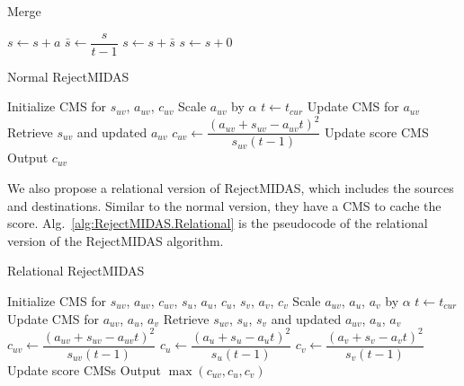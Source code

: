\documentclass[5p]{elsarticle}
\begin{document}
	\begin{algorithm}[!htb]
		\caption{Merge}
		\label{alg:RejectMIDAS.Merge}
		\begin{algorithmic}[1]
			\State $s\gets s+a$
			\State $\bar s\gets \dfrac{s}{t-1}$
			\State $s\gets s+\bar s$
			\Else
			\State $s\gets s+0$
			\EndIf
			\EndFor
		\end{algorithmic}
	\end{algorithm}

	\begin{algorithm}[!htb]
		\caption{Normal RejectMIDAS}
		\label{alg:RejectMIDAS.Normal}
		\begin{algorithmic}[1]
			\State Initialize CMS for $s_{uv}$, $a_{uv}$, $c_{uv}$
			\State {}
			\State Scale $a_{uv}$ by $\alpha$
			\State $t\gets t_{cur}$
			\EndIf
			\State Update CMS for $a_{uv}$
			\State Retrieve $s_{uv}$ and updated $a_{uv}$
			\State $c_{uv}\gets\dfrac{(a_{uv}+s_{uv}-a_{uv}t)^2}{s_{uv}(t-1)}$
			\State Update score CMS
			\State Output $c_{uv}$
			\EndWhile
		\end{algorithmic}
	\end{algorithm}

	We also propose a relational version of RejectMIDAS, which includes the sources and destinations. Similar to the normal version, they have a CMS to cache the score. Alg.~\ref{alg:RejectMIDAS.Relational} is the pseudocode of the relational version of the RejectMIDAS algorithm.

	\begin{algorithm}[!htb]
		\caption{Relational RejectMIDAS}
		\label{alg:RejectMIDAS.Relational}
		\begin{algorithmic}[1]
			\State Initialize CMS for $s_{uv}$, $a_{uv}$, $c_{uv}$, $s_u$, $a_u$, $c_u$, $s_v$, $a_v$, $c_v$
			\State {}
			\State {}
			\State {}
			\State Scale $a_{uv}$, $a_u$, $a_v$ by $\alpha$
			\State $t\gets t_{cur}$
			\EndIf
			\State Update CMS for $a_{uv}$, $a_u$, $a_v$
			\State Retrieve $s_{uv}$, $s_u$, $s_v$ and updated $a_{uv}$, $a_u$, $a_v$
			\State $c_{uv}\gets\dfrac{(a_{uv}+s_{uv}-a_{uv}t)^2}{s_{uv}(t-1)}$
			\State $c_u\gets\dfrac{(a_u+s_u-a_ut)^2}{s_u(t-1)}$
			\State $c_v\gets\dfrac{(a_v+s_v-a_vt)^2}{s_v(t-1)}$
			\State Update score CMSs
			\State Output $\max(c_{uv},c_u,c_v)$
			\EndWhile
		\end{algorithmic}
	\end{algorithm}
\end{document}
